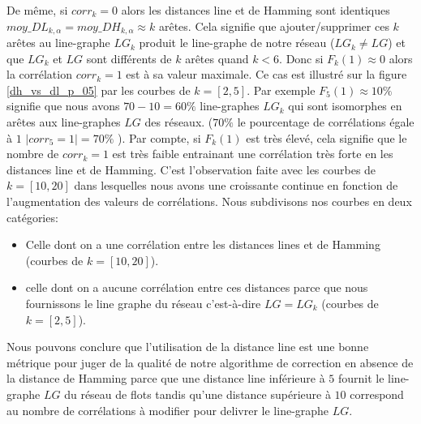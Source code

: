 De m\^eme, si $corr_k = 0$ alors les distances line et de Hamming sont identiques $ moy\_DL_{k, \alpha} = moy\_DH_{k, \alpha} \approx k$ ar\^etes. Cela signifie que ajouter/supprimer ces $k$ ar\^etes au line-graphe $LG_k$ produit le line-graphe de notre r\'eseau ($LG_{k} \neq LG$) et que $LG_{k}$ et $LG$ sont diff\'erents de $k$ ar\^etes quand $k < 6$.
\newline
Donc si $F_k(1) \approx 0$ alors la corr\'elation $corr_k = 1$ est \`a sa valeur maximale. Ce cas est illustr\'e sur la figure \ref{dh_vs_dl_p_05} par les courbes de $k=[2,5]$. 
Par exemple $F_5(1) \approx 10\%$ signifie que nous avons $70-10=60\%$ line-graphes $LG_k$ qui sont isomorphes en ar\^etes aux line-graphes $LG$ des r\'eseaux. ($70\%$ le pourcentage de corr\'elations \'egale \`a $1$ $|corr_5 = 1 | = 70\%$ ).
\newline
Par compte, si  $F_k(1)$ est tr\`es \'elev\'e, cela signifie que le nombre de $corr_k = 1$ est tr\`es faible entrainant une corr\'elation tr\`es forte en les distances line et de Hamming.
C'est l'observation faite avec les courbes de $k = [10,20]$ dans lesquelles nous avons une  croissante continue en fonction de l'augmentation des valeurs de corr\'elations.
\newline
Nous subdivisons nos courbes en deux cat\'egories:
\begin{itemize}
	\item Celle dont on a une corr\'elation entre les distances lines et de Hamming (courbes de $k = [10,20]$).
	\item celle dont on a aucune corr\'elation entre ces distances parce que nous fournissons le line graphe du r\'eseau c'est-\`a-dire  $LG = LG_k$ (courbes de $k = [2,5]$). 
\end{itemize}
Nous pouvons conclure que l'utilisation de la distance line est une bonne m\'etrique pour juger de la qualit\'e de notre algorithme de correction en absence de la distance de Hamming parce que une distance line inf\'erieure \`a $5$ fournit le line-graphe $LG$ du r\'eseau de flots tandis qu'une distance sup\'erieure \`a $10$ correspond au nombre de corr\'elations \`a modifier pour delivrer le line-graphe $LG$. 